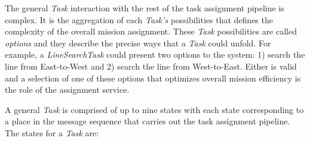 The general \emph{Task} interaction with the rest of the task assignment
pipeline is complex. It is the aggregation of each \emph{Task's}
possibilities that defines the complexity of the overall mission
assignment. These \emph{Task} possibilities are called \emph{options}
and they describe the precise ways that a \emph{Task} could unfold. For
example, a \emph{LineSearchTask} could present two options to the
system: 1) search the line from East-to-West and 2) search the line from
West-to-East. Either is valid and a selection of one of these options
that optimizes overall mission efficiency is the role of the assignment
service.

A general \emph{Task} is comprised of up to nine states with each state
corresponding to a place in the message sequence that carries out the
task assignment pipeline. The states for a \emph{Task} are:

